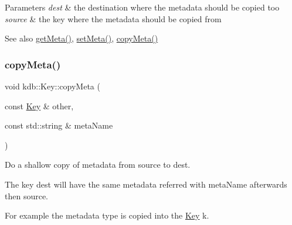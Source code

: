 \begin{DoxyParams}{Parameters}
{\em dest} & the destination where the metadata should be copied too \\
\hline
{\em source} & the key where the metadata should be copied from\\
\hline
\end{DoxyParams}
\begin{DoxySeeAlso}{See also}
\mbox{\hyperlink{classkdb_1_1Key_acdd4e81b0565756c99826bf926fd6fe4}{get\+Meta()}}, \mbox{\hyperlink{classkdb_1_1Key_a4c5a3d463127ade0b766c4298002daa3}{set\+Meta()}}, \mbox{\hyperlink{classkdb_1_1Key_a53f6d2196a7f17c4bdc544207bdc5f4c}{copy\+Meta()}} 
\end{DoxySeeAlso}
\mbox{\label{classkdb_1_1Key_a53f6d2196a7f17c4bdc544207bdc5f4c}} 
\subsubsection{\texorpdfstring{copyMeta()}{copyMeta()}}
{\footnotesize\ttfamily void kdb\+::\+Key\+::copy\+Meta (\begin{DoxyParamCaption}\item[{const \mbox{\hyperlink{classkdb_1_1Key}{Key}} \&}]{other,  }\item[{const std\+::string \&}]{meta\+Name }\end{DoxyParamCaption})\hspace{0.3cm}{\ttfamily [inline]}}



Do a shallow copy of metadata from source to dest. 

The key dest will have the same metadata referred with meta\+Name afterwards then source.

For example the metadata type is copied into the \mbox{\hyperlink{classkdb_1_1Key}{Key}} k.


\begin{DoxyCode}{0}
\DoxyCodeLine{\{}
\DoxyCodeLine{        \textcolor{comment}{// receive c}}
\DoxyCodeLine{        \textcolor{comment}{// the caller will see the changed key k}}
\DoxyCodeLine{        \textcolor{comment}{// with the metadata "type" from c}}
\DoxyCodeLine{\}}
\end{DoxyCode}


